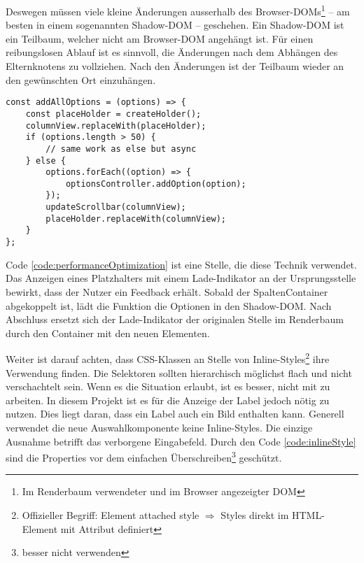 Deswegen müssen viele kleine Änderungen ausserhalb des Browser-DOMs\footnote{
    Im Renderbaum verwendeter und im Browser angezeigter DOM
} – am besten in einem sogenannten Shadow-DOM – geschehen. 
Ein Shadow-DOM ist ein Teilbaum, welcher nicht am Browser-DOM angehängt ist. 
Für einen reibungslosen Ablauf ist es sinnvoll, die Änderungen nach dem Abhängen des Elternknotens zu vollziehen. 
Nach den Änderungen ist der Teilbaum wieder an den gewünschten Ort einzuhängen. 

\begin{lstlisting}[style = htmlcssjs, caption = Performance Optimierung (aus \codestyle{columnOptionsComponent.js}), label = code:performanceOptimization]
const addAllOptions = (options) => {
    const placeHolder = createHolder();
    columnView.replaceWith(placeHolder);
    if (options.length > 50) {
        // same work as else but async
    } else {
        options.forEach((option) => {
            optionsController.addOption(option);
        });
        updateScrollbar(columnView);
        placeHolder.replaceWith(columnView);
    }
};
\end{lstlisting}

Code \ref{code:performanceOptimization} ist eine Stelle, die diese Technik verwendet. 
Das Anzeigen eines Platzhalters mit einem Lade-Indikator an der Ursprungsstelle bewirkt, dass der Nutzer ein Feedback erhält. 
Sobald der SpaltenContainer abgekoppelt ist, lädt die Funktion die Optionen in den Shadow-DOM. 
Nach Abschluss ersetzt sich der Lade-Indikator der originalen Stelle im Renderbaum durch den Container mit den neuen Elementen. 

Weiter ist darauf achten, dass CSS-Klassen an Stelle von Inline-Styles\footnote{
    Offizieller Begriff: Element attached style $\Rightarrow$ Styles direkt im HTML-Element mit Attribut  definiert
} ihre Verwendung finden. 
Die Selektoren sollten hierarchisch möglichst flach und nicht verschachtelt sein. 
Wenn es die Situation erlaubt, ist es besser, nicht mit  zu arbeiten. 
In diesem Projekt ist es für die Anzeige der Label jedoch nötig  zu nutzen. 
Dies liegt daran, dass ein Label auch ein Bild enthalten kann. 
Generell verwendet die neue Auswahlkomponente keine Inline-Styles. 
Die einzige Ausnahme betrifft das verborgene Eingabefeld. 
Durch den Code \ref{code:inlineStyle} sind die Properties vor dem einfachen Überschreiben\footnote{
     besser nicht verwenden
} geschützt. 

